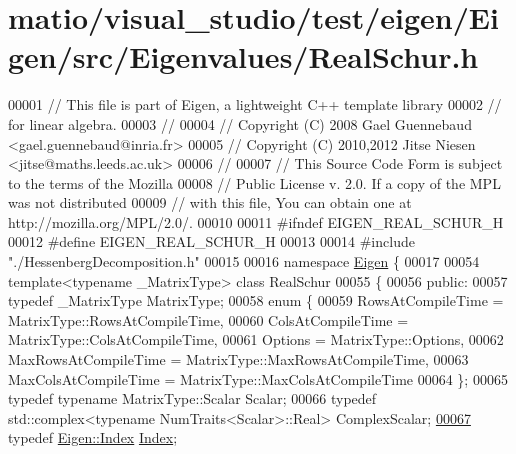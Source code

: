 \hypertarget{matio_2visual__studio_2test_2eigen_2_eigen_2src_2_eigenvalues_2_real_schur_8h_source}{}\section{matio/visual\+\_\+studio/test/eigen/\+Eigen/src/\+Eigenvalues/\+Real\+Schur.h}
\label{matio_2visual__studio_2test_2eigen_2_eigen_2src_2_eigenvalues_2_real_schur_8h_source}

\begin{DoxyCode}
00001 \textcolor{comment}{// This file is part of Eigen, a lightweight C++ template library}
00002 \textcolor{comment}{// for linear algebra.}
00003 \textcolor{comment}{//}
00004 \textcolor{comment}{// Copyright (C) 2008 Gael Guennebaud <gael.guennebaud@inria.fr>}
00005 \textcolor{comment}{// Copyright (C) 2010,2012 Jitse Niesen <jitse@maths.leeds.ac.uk>}
00006 \textcolor{comment}{//}
00007 \textcolor{comment}{// This Source Code Form is subject to the terms of the Mozilla}
00008 \textcolor{comment}{// Public License v. 2.0. If a copy of the MPL was not distributed}
00009 \textcolor{comment}{// with this file, You can obtain one at http://mozilla.org/MPL/2.0/.}
00010 
00011 \textcolor{preprocessor}{#ifndef EIGEN\_REAL\_SCHUR\_H}
00012 \textcolor{preprocessor}{#define EIGEN\_REAL\_SCHUR\_H}
00013 
00014 \textcolor{preprocessor}{#include "./HessenbergDecomposition.h"}
00015 
00016 \textcolor{keyword}{namespace }\hyperlink{namespace_eigen}{Eigen} \{ 
00017 
00054 \textcolor{keyword}{template}<\textcolor{keyword}{typename} \_MatrixType> \textcolor{keyword}{class }RealSchur
00055 \{
00056   \textcolor{keyword}{public}:
00057     \textcolor{keyword}{typedef} \_MatrixType MatrixType;
00058     \textcolor{keyword}{enum} \{
00059       RowsAtCompileTime = MatrixType::RowsAtCompileTime,
00060       ColsAtCompileTime = MatrixType::ColsAtCompileTime,
00061       Options = MatrixType::Options,
00062       MaxRowsAtCompileTime = MatrixType::MaxRowsAtCompileTime,
00063       MaxColsAtCompileTime = MatrixType::MaxColsAtCompileTime
00064     \};
00065     \textcolor{keyword}{typedef} \textcolor{keyword}{typename} MatrixType::Scalar Scalar;
00066     \textcolor{keyword}{typedef} std::complex<typename NumTraits<Scalar>::Real> ComplexScalar;
\hyperlink{group___eigenvalues___module_a8bd4653e2d9569a44ecc95e746422d3f}{00067}     \textcolor{keyword}{typedef} \hyperlink{namespace_eigen_a62e77e0933482dafde8fe197d9a2cfde}{Eigen::Index} \hyperlink{group___eigenvalues___module_a8bd4653e2d9569a44ecc95e746422d3f}{Index}; 

\end{DoxyCode}
